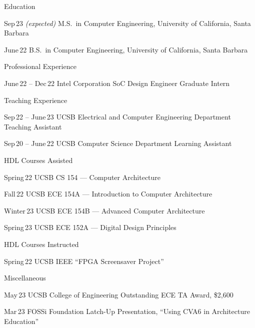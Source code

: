 \begin{vitae}

    \begin{vitaesection}{Education}
    \vspace{-0.1cm}
    \item [Sep\,23 \emph{(expected)}] M.S.\ in Computer Engineering, University of California, Santa Barbara
    \item [June\,22] B.S.\ in Computer Engineering, University of California, Santa Barbara
    \end{vitaesection}

    \begin{vitaesection}{Professional Experience}
        \vspace{-0.1cm}
        \item [June\,22 -- Dec\,22] Intel Corporation SoC Design Engineer Graduate Intern
    \end{vitaesection}

    \begin{vitaesection}{Teaching Experience}
        \vspace{-0.1cm}
        \item [Sep\,22 -- June\,23] UCSB Electrical and Computer Engineering Department Teaching Assistant
        \item [Sep\,20 -- June\,22] UCSB Computer Science Department Learning Assistant
    \end{vitaesection}

    \begin{vitaesection}{HDL Courses Assisted}
        \vspace{-0.1cm}
        \item [Spring\,22] UCSB CS 154 --- Computer Architecture
        \item [Fall\,22] UCSB ECE 154A --- Introduction to Computer Architecture
        \item [Winter\,23] UCSB ECE 154B --- Advanced Computer Architecture
        \item [Spring\,23] UCSB ECE 152A --- Digital Design Principles
    \end{vitaesection}

    \begin{vitaesection}{HDL Courses Instructed}
        \vspace{-0.1cm}
        \item [Spring\,22] UCSB IEEE \enquote{FPGA Screensaver Project}
    \end{vitaesection}

    \begin{vitaesection}{Miscellaneous}
        \vspace{-0.1cm}
        \item [May\,23] UCSB College of Engineering Outstanding ECE TA Award, \$2,600
        \item [Mar\,23] FOSSi Foundation Latch-Up Presentation, \enquote{Using CVA6 in Architecture Education}
    \end{vitaesection}

\end{vitae}
